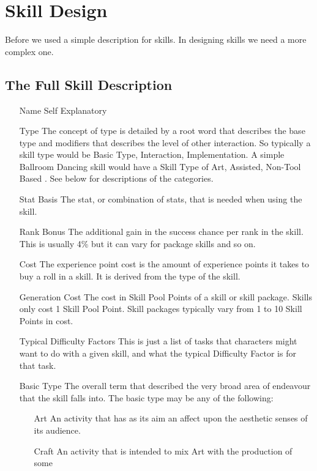 \chapter{Skill Design}

Before we used a simple description for skills. In designing skills we need
a more complex one.

\section{The Full Skill Description}
\small

\begin{itemize}
	\item[Name] Self Explanatory
	\item[Type] The concept of type is detailed by a root word that describes the base
	type and modifiers that describes the level of other interaction. So
	typically a skill type would be Basic Type, Interaction, Implementation.
	A simple Ballroom Dancing skill would have a Skill Type of
	Art, Assisted, Non-Tool Based . See below for descriptions of the
	categories.
	\item[Stat Basis] The stat, or combination of stats, that is needed
	when using the skill.
	\item[Rank Bonus] The additional gain in the success chance per rank
	in the skill. This is usually 4\% but it can vary for package skills
	and so on.
	\item[Cost]	The experience point cost is the amount of experience points it takes to
	buy a roll in a skill. It is derived from the type of the skill.
	\item[Generation Cost]
	The cost in Skill Pool Points of a skill or skill package. Skills
	only cost 1 Skill Pool Point. Skill packages typically vary from 1
	to 10 Skill Points in cost.
	\item[Typical Difficulty Factors]
	This is just a list of tasks that characters might want to do with a
	given skill, and what the typical Difficulty Factor is for that task.
	\item[Basic Type]
	The overall term that described the very broad area of
	endeavour that the skill falls into. The basic type may be any of the
	following:
	\begin{itemize}
		\item[Art]
		An activity that has as its aim an affect upon the aesthetic senses of its
		audience.
		\item[Craft]
		An activity that is intended to mix Art with the production of some

\end{itemize}
\end{itemize}
